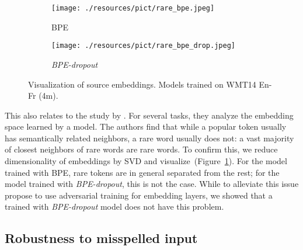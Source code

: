 \documentclass[11pt,a4paper]{article}
\begin{document}
\begin{figure}[t!]
    \centering
    \begin{subfigure}[b]{0.22\textwidth}
        \texttt{[image: ./resources/pict/rare\_bpe.jpeg]}
        \caption{BPE}
\end{subfigure}
    \quad \begin{subfigure}[b]{0.22\textwidth}
       \texttt{[image: ./resources/pict/rare\_bpe\_drop.jpeg]}
        \caption{\textit{BPE-dropout}}
\end{subfigure}
    \caption{Visualization of source embeddings. Models trained on WMT14 En-Fr (4m).}
    \label{fig:rare_embs}
\end{figure}


This also relates to the study by \citet{gong2018frage}. For several tasks, they analyze the embedding space learned by a model. The authors find that while a popular token usually has semantically related neighbors, a rare word usually does not: a vast majority of closest neighbors of rare words are rare words. To confirm this, we reduce dimensionality of embeddings by SVD and visualize~(Figure~\ref{fig:rare_embs}). For the model trained with BPE, rare tokens are in general separated from the rest; for the model trained with \textit{BPE-dropout}, this is not the case. While to alleviate this issue \citet{gong2018frage} propose to use adversarial training for embedding layers, we showed that a trained with \textit{BPE-dropout} model does not have this problem.




\subsection{Robustness to misspelled input}
\label{sect:misspel}

\newcommand{\red}[1]{\textcolor{red}{#1}}
\end{document}
